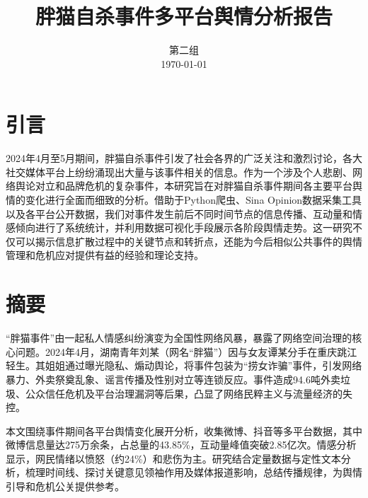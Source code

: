 \documentclass{article}
\begin{document}
\title{胖猫自杀事件多平台舆情分析报告}
\author{\vspace{0.5cm} \normalsize 第二组 \\ \vspace{0.2cm} \normalsize \today}
\date{}
\maketitle

\tableofcontents
\newpage

\section{引言}
2024年4月至5月期间，胖猫自杀事件引发了社会各界的广泛关注和激烈讨论，各大社交媒体平台上纷纷涌现出大量与该事件相关的信息。作为一个涉及个人悲剧、网络舆论对立和品牌危机的复杂事件，本研究旨在对胖猫自杀事件期间各主要平台舆情的变化进行全面而细致的分析。借助于Python爬虫、Sina Opinion数据采集工具以及各平台公开数据，我们对事件发生前后不同时间节点的信息传播、互动量和情感倾向进行了系统统计，并利用数据可视化手段展示各阶段舆情走势。这一研究不仅可以揭示信息扩散过程中的关键节点和转折点，还能为今后相似公共事件的舆情管理和危机应对提供有益的经验和理论支持。

\section{摘要}
“胖猫事件”由一起私人情感纠纷演变为全国性网络风暴，暴露了网络空间治理的核心问题。2024年4月，湖南青年刘某（网名“胖猫”）因与女友谭某分手在重庆跳江轻生。其姐姐通过曝光隐私、煽动舆论，将事件包装为“捞女诈骗”事件，引发网络暴力、外卖祭奠乱象、谣言传播及性别对立等连锁反应。事件造成94.6吨外卖垃圾、公众信任危机及平台治理漏洞等后果，凸显了网络民粹主义与流量经济的失控。

本文围绕事件期间各平台舆情变化展开分析，收集微博、抖音等多平台数据，其中微博信息量达275万余条，占总量的43.85\%，互动量峰值突破2.85亿次。情感分析显示，网民情绪以愤怒（约24\%）和悲伤为主。研究结合定量数据与定性文本分析，梳理时间线、探讨关键意见领袖作用及媒体报道影响，总结传播规律，为舆情引导和危机公关提供参考。
\end{document}
